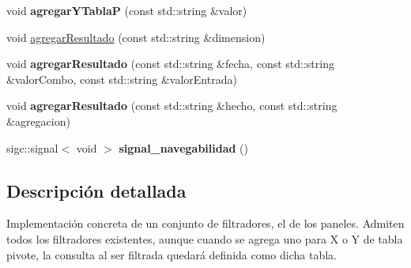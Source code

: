 \begin{DoxyCompactItemize}
\item 
\hypertarget{classFiltradoresPanel_aaed9cc5c1056264d2f422ff78c2ca545}{void {\bfseries agregar\-Y\-Tabla\-P} (const std\-::string \&valor)}\label{classFiltradoresPanel_aaed9cc5c1056264d2f422ff78c2ca545}

\item 
void \hyperlink{classFiltradoresPanel_aadf1d546161094234541c02f15eaea00}{agregar\-Resultado} (const std\-::string \&dimension)
\item 
\hypertarget{classFiltradoresPanel_ad2fdf19683ace05463081371204ea092}{void {\bfseries agregar\-Resultado} (const std\-::string \&fecha, const std\-::string \&valor\-Combo, const std\-::string \&valor\-Entrada)}\label{classFiltradoresPanel_ad2fdf19683ace05463081371204ea092}

\item 
\hypertarget{classFiltradoresPanel_a55f2a7dde1e8b0d3d2b12a0e810f4a38}{void {\bfseries agregar\-Resultado} (const std\-::string \&hecho, const std\-::string \&agregacion)}\label{classFiltradoresPanel_a55f2a7dde1e8b0d3d2b12a0e810f4a38}

\item 
\hypertarget{classFiltradoresPanel_afc27cd818da0c0bef5c8668df186c240}{sigc\-::signal$<$ void $>$ {\bfseries signal\-\_\-navegabilidad} ()}\label{classFiltradoresPanel_afc27cd818da0c0bef5c8668df186c240}

\end{DoxyCompactItemize}


\subsection{\-Descripción detallada}
\-Implementación concreta de un conjunto de filtradores, el de los paneles. \-Admiten todos los filtradores existentes, aunque cuando se agrega uno para \-X o \-Y de tabla pivote, la consulta al ser filtrada quedará definida como dicha tabla. 

